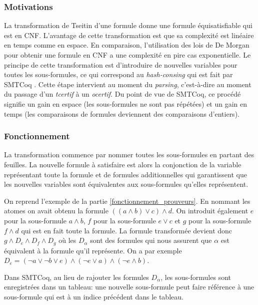 \documentclass[11pt]{article}
\begin{document}
\subsubsection{Motivations}

La transformation de Tseitin d'une formule donne une formule équisatisfiable qui est en CNF. L'avan\-tage de cette transformation est que sa complexité est linéaire en temps comme en espace. En comparaison, l'utilisation des lois de De Morgan pour obtenir une formule en CNF a une complexité en pire cas exponentielle. Le principe de cette transformation est d'introduire de nouvelles variables pour toutes les sous-formules, ce qui correspond au \textit{hash-consing} qui est fait par SMTCoq \cite{smtcoq_code}. Cette étape intervient au moment du \textit{parsing}, c'est-à-dire au moment du passage d'un \textit{tcertif} à un \textit{ocertif}. Du point de vue de SMTCoq, ce procédé signifie un gain en espace (les sous-formules ne sont pas répétées) et un gain en temps (les comparaisons de formules deviennent des comparaisons d'entiers).


\subsubsection{Fonctionnement}

La transformation commence par nommer toutes les sous-formules en partant des feuilles. La nouvelle formule à satisfaire est alors la conjonction de la variable représentant toute la formule et de formules additionnelles qui garantissent que les nouvelles variables sont équivalentes aux sous-formules qu'elles représentent. \medbreak

On reprend l'exemple de la partie \ref{fonctionnement_prouveurs}. En nommant les atomes on avait obtenu la formule $((a \wedge b) \vee c) \wedge d$. On introduit également $e$ pour la sous-formule $a \wedge b$, $f$ pour la sous-formule $e \vee c$ et $g$ pour la sous-formule $f \wedge d$ qui est en fait toute la formule. La formule transformée devient donc $g \wedge D_e \wedge D_f \wedge D_g$ où les $D_\alpha$ sont des formules qui nous assurent que $\alpha$ est équivalent à la formule qu'il représente. On a par exemple $D_e = (\neg a \vee \neg b \vee e) \wedge (\neg e \vee a) \wedge (\neg e \wedge b)$. \medbreak

Dans SMTCoq, au lieu de rajouter les formules $D_\alpha$, les sous-formules sont enregistrées dans un tableau: une nouvelle sous-formule peut faire référence à une sous-formule qui est à un indice précédent dans le tableau. 
\end{document}
